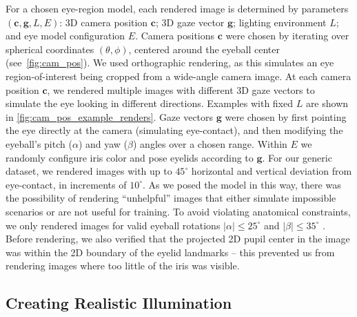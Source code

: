 For a chosen eye-region model, each rendered image is determined by parameters $(\mathbf{c}, \mathbf{g}, L, E)$: 3D camera position $\mathbf{c}$; 3D gaze vector $\mathbf{g}$; lighting environment $L$; and eye model configuration $E$.
Camera positions $\mathbf{c}$ were chosen by iterating over spherical coordinates $(\theta, \phi)$, centered around the eyeball center (see~\autoref{fig:cam_pos}).
We used orthographic rendering, as this simulates an eye region-of-interest being cropped from a wide-angle camera image.
At each camera position $\mathbf{c}$, we rendered multiple images with different 3D gaze vectors to simulate the eye looking in different directions.
Examples with fixed $L$ are shown in \autoref{fig:cam_pos_example_renders}.
Gaze vectors $\mathbf{g}$ were chosen by first pointing the eye directly at the camera (simulating eye-contact), and then modifying the eyeball's pitch ($\alpha$) and yaw ($\beta$) angles over a chosen range.
Within $E$ we randomly configure iris color and pose eyelids according to $\mathbf{g}$.
For our generic dataset, we rendered images with up to $45^{\circ}$ horizontal and vertical deviation from eye-contact, in increments of $10^{\circ}$.
%
As we posed the model in this way, there was the possibility of rendering ``unhelpful'' images that either simulate impossible scenarios or are not useful for training.
To avoid violating anatomical constraints, we only rendered images for valid eyeball rotations $|\alpha|\!\leq\!25^{\circ}$ and $|\beta|\!\leq\!35^{\circ}$ \cite{MIL-STD-1472G}.
Before rendering, we also verified that the projected 2D pupil center in the image was within the 2D boundary of the eyelid landmarks -- this prevented us from rendering images where too little of the iris was visible.

\subsection{Creating Realistic Illumination}

